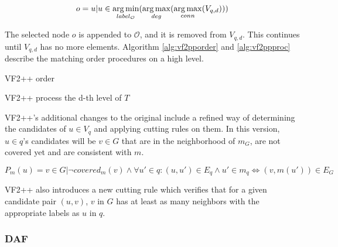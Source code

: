 \[ o = {u | u \in \operatorname*{arg\,min}_{label_{\mathcal{O}}}(\operatorname*{arg\,max}_{deg}(\operatorname*{arg\,max}_{conn}(V_{q,d})))} \]

The selected node $o$ is appended to $\mathcal{O}$, and it is removed from $V_{q,d}$. This continues 
until $V_{q,d}$ has no more elements. Algorithm \ref{alg:vf2pporder} and \ref{alg:vf2ppproc} describe
the matching order procedures on a high level.

\begin{algorithm}[h]
    \SetAlgoLined\DontPrintSemicolon
    \label{alg:vf2pporder}
    \caption{VF2++ order}
\end{algorithm}

\begin{algorithm}[h]
    \SetAlgoLined\DontPrintSemicolon
    \label{alg:vf2ppproc}
    \caption{VF2++ process the d-th level of $T$}
\end{algorithm}

VF2++'s additional changes to the original include a refined way of determining the candidates
of $u \in V_q$ and applying cutting rules on them. In this version, $u \in q$'s candidates will be 
$v \in G$ that are in the neighborhood of $m_G$, are not covered yet and are consistent with $m$.

\[ P_m(u) = {v \in G | \neg covered_m(v) \land \forall u' \in q: (u, u') \in E_q \land u' \in m_q \iff (v, m(u')) \in E_G}  \]

VF2++ also introduces a new cutting rule which verifies that for a given candidate pair $(u, v)$,
$v$ in $G$ has at least as many neighbors with the appropriate labels as $u$ in $q$.


\subsubsection{DAF}